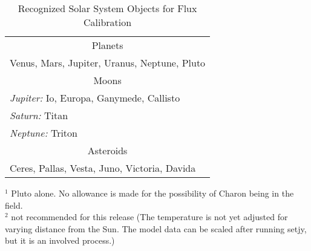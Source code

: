 \vspace{5mm}
\begin{table}[h!]
\caption{Recognized Solar System Objects for Flux Calibration
        {\label{table:fluxcal-table-solarsystem}}}
\begin{center}
\begin{tabular}{|l|} \hline
\hline
\multicolumn{1}{|c|}{Planets} \\

Venus, Mars, Jupiter, Uranus, Neptune, Pluto\footnotemark[1]\\
\hline
\multicolumn{1}{|c|}{Moons}\\
{\it Jupiter:} Io, Europa, Ganymede, Callisto\\
{\it Saturn:}  Titan \\
{\it Neptune:} Triton \\
\hline
\multicolumn{1}{|c|}{Asteroids}\\
Ceres, Pallas\footnotemark[2], Vesta\footnotemark[2], Juno\footnotemark[2], Victoria\footnotemark[2], Davida\footnotemark[2]\\
\hline
\end{tabular}
\end{center}
\footnotesize
$^1$ Pluto alone.  No allowance is made for the possibility of Charon
  being in the field.\\
$^2$ not recommended for this release (The temperature is not yet adjusted
   for varying distance from the Sun.  The model data can be scaled after
   running setjy, but it is an involved process.)
\normalsize

\end{table}


